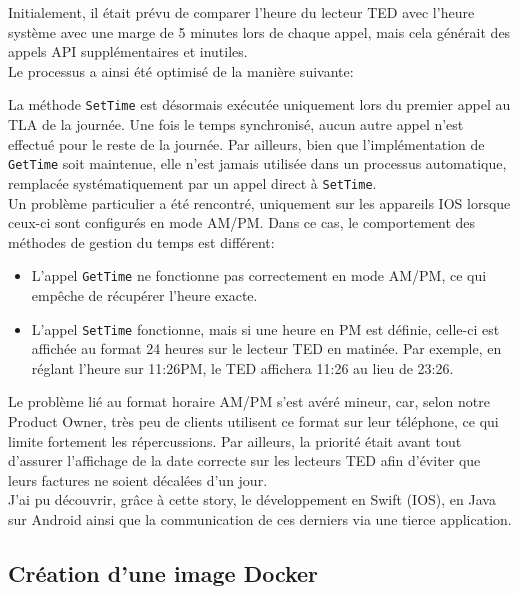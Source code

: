 \documentclass{article}
\begin{document}
Initialement, il était prévu de comparer l'heure du lecteur TED avec l'heure système avec une marge de 5 minutes lors de chaque appel, mais cela générait des appels API supplémentaires et inutiles. \\

Le processus a ainsi été optimisé de la manière suivante:

La méthode \texttt{SetTime} est désormais exécutée uniquement lors du premier appel au TLA de la journée. Une fois le temps synchronisé, aucun autre appel n'est effectué pour le reste de la journée. Par ailleurs, bien que l'implémentation de \texttt{GetTime} soit maintenue, elle n'est jamais utilisée dans un processus automatique, remplacée systématiquement par un appel direct à \texttt{SetTime}. \\

Un problème particulier a été rencontré, uniquement sur les appareils IOS lorsque ceux-ci sont configurés en mode AM/PM. Dans ce cas, le comportement des méthodes de gestion du temps est différent:

\begin{itemize}
    \item L'appel \texttt{GetTime} ne fonctionne pas correctement en mode AM/PM, ce qui empêche de récupérer l'heure exacte.
    \item L'appel \texttt{SetTime} fonctionne, mais si une heure en PM est définie, celle-ci est affichée au format 24 heures sur le lecteur TED en matinée. Par exemple, en réglant l'heure sur 11:26PM, le TED affichera 11:26 au lieu de 23:26.
\end{itemize}

Le problème lié au format horaire AM/PM s'est avéré mineur, car, selon notre Product Owner, très peu de clients utilisent ce format sur leur téléphone, ce qui limite fortement les répercussions. Par ailleurs, la priorité était avant tout d'assurer l'affichage de la date correcte sur les lecteurs TED afin d'éviter que leurs factures ne soient décalées d'un jour. \\

J'ai pu découvrir, grâce à cette story, le développement en Swift (IOS), en Java sur Android ainsi que la communication de ces derniers via une tierce application.

\newpage

\subsection{Création d'une image Docker}
\end{document}

